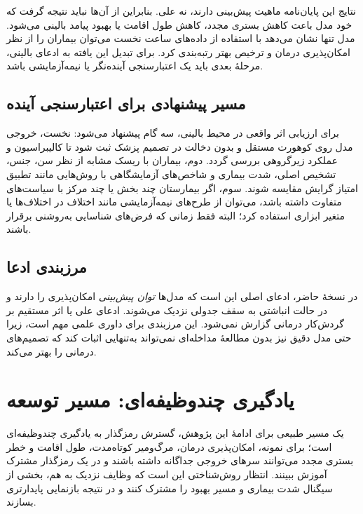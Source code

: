 نتایج این پایان‌نامه ماهیت پیش‌بینی دارند، نه علی. بنابراین از آن‌ها نباید نتیجه گرفت که خود مدل باعث کاهش بستری مجدد، کاهش طول اقامت یا بهبود پیامد بالینی می‌شود. مدل تنها نشان می‌دهد با استفاده از داده‌های  ساعت نخست می‌توان بیماران را از نظر امکان‌پذیری درمان و ترخیص بهتر رتبه‌بندی کرد. برای تبدیل این یافته به ادعای بالینی، مرحلۀ بعدی باید یک اعتبارسنجی آینده‌نگر یا نیمه‌آزمایشی باشد.

\subsection{مسیر پیشنهادی برای اعتبارسنجی آینده}

برای ارزیابی اثر واقعی در محیط بالینی، سه گام پیشنهاد می‌شود: نخست، خروجی مدل روی کوهورت مستقل و بدون دخالت در تصمیم پزشک ثبت شود تا کالیبراسیون و عملکرد زیرگروهی بررسی گردد. دوم، بیماران با ریسک مشابه از نظر سن، جنس، تشخیص اصلی، شدت بیماری و شاخص‌های آزمایشگاهی با روش‌هایی مانند تطبیق امتیاز گرایش مقایسه شوند. سوم، اگر بیمارستان چند بخش یا چند مرکز با سیاست‌های متفاوت داشته باشد، می‌توان از طرح‌های نیمه‌آزمایشی مانند اختلاف در اختلاف‌ها یا متغیر ابزاری استفاده کرد؛ البته فقط زمانی که فرض‌های شناسایی به‌روشنی برقرار باشند.

\subsection{مرزبندی ادعا}

در نسخۀ حاضر، ادعای اصلی این است که مدل‌ها \emph{توان پیش‌بینی} امکان‌پذیری را دارند و در حالت انباشتی به سقف جدولی نزدیک می‌شوند. ادعای علی یا اثر مستقیم بر گردش‌کار درمانی گزارش نمی‌شود. این مرزبندی برای داوری علمی مهم است، زیرا حتی مدل دقیق نیز بدون مطالعۀ مداخله‌ای نمی‌تواند به‌تنهایی اثبات کند که تصمیم‌های درمانی را بهتر می‌کند.

\section{یادگیری چندوظیفه‌ای: مسیر توسعه}

یک مسیر طبیعی برای ادامۀ این پژوهش، گسترش رمزگذار  به یادگیری چندوظیفه‌ای است؛ برای نمونه، امکان‌پذیری درمان، مرگ‌ومیر کوتاه‌مدت، طول اقامت  و خطر بستری مجدد می‌توانند سرهای خروجی جداگانه داشته باشند و در یک رمزگذار مشترک آموزش ببینند. انتظار روش‌شناختی این است که وظایف نزدیک به هم، بخشی از سیگنال شدت بیماری و مسیر بهبود را مشترک کنند و در نتیجه بازنمایی پایدارتری بسازند.

